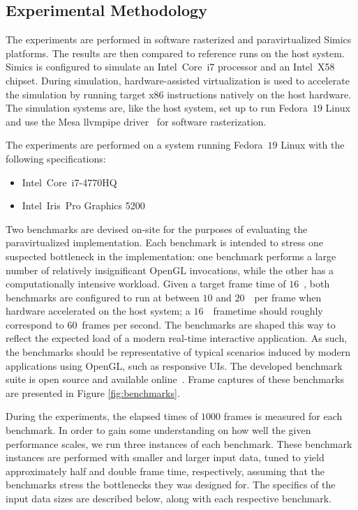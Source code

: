 \subsection{Experimental Methodology}
\label{sec:experimentalmethodology}
The experiments are performed in software rasterized and paravirtualized Simics platforms.
The results are then compared to reference runs on the host system.
Simics is configured to simulate an Intel\circledR ~Core\texttrademark ~i7 processor and an Intel\circledR ~X58 chipset.
During simulation, hardware-assisted virtualization is used to accelerate the simulation by running target x86 instructions natively on the host hardware.
The simulation systems are, like the host system, set up to run Fedora~$19$ Linux and use the Mesa llvmpipe driver~ for software rasterization.

The experiments are performed on a system running Fedora~$19$ Linux with the following specifications:
\begin{itemize}
\item Intel\circledR\ Core\texttrademark\ i7-4770HQ
\item Intel\circledR\ Iris\texttrademark\ Pro Graphics 5200
\end{itemize}

Two benchmarks are devised on-site for the purposes of evaluating the paravirtualized implementation.
Each benchmark is intended to stress one suspected bottleneck in the implementation: one benchmark performs a large number of relatively insignificant OpenGL invocations, while the other has a computationally intensive workload.
Given a target frame time of $16$~\milli\second , both benchmarks are configured to run at between $10$ and $20$~\milli\second\ per frame when hardware accelerated on the host system; a $16$~\milli\second\ frametime should roughly correspond to $60$~frames per second.
The benchmarks are shaped this way to reflect the expected load of a modern real-time interactive application.
As such, the benchmarks should be representative of typical scenarios induced by modern applications using OpenGL, such as responsive UIs.
The developed benchmark suite is open source and available online~.
Frame captures of these benchmarks are presented in Figure \ref{fig:benchmarks}.

During the experiments, the elapsed times of $1000$ frames is measured for each benchmark.
In order to gain some understanding on how well the given performance scales, we run three instances of each benchmark.
These benchmark instances are performed with smaller and larger input data, tuned to yield approximately half and double frame time, respectively, assuming that the benchmarks stress the bottlenecks they was designed for.
The specifics of the input data sizes are described below, along with each respective benchmark.

